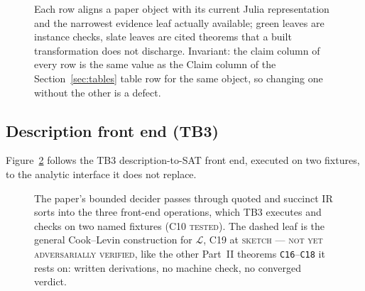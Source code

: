 \begin{figure}[H]
\centering

\caption{Each row aligns a paper object with its current Julia representation and the narrowest evidence leaf actually available; green leaves are instance checks, slate leaves are cited theorems that a built transformation does not discharge.  Invariant: the claim column of every row is the same value as the Claim column of the Section~\ref{sec:tables} table row for the same object, so changing one without the other is a defect.}
\label{fig:correspondence-map}
\end{figure}

\subsection{Description front end (TB3)}

Figure~\ref{fig:D-correspondence-description} follows the TB3
description-to-SAT front end, executed on two fixtures, to the analytic
interface it does not replace.
\begin{figure}[H]
\centering

\caption{The paper's bounded decider passes through quoted and succinct IR sorts into the three front-end operations, which TB3 executes and checks on two named fixtures (C10 \textsc{tested}).  The dashed leaf is the general Cook--Levin construction for \(\mathcal L\), C19 at \textsc{sketch --- not yet adversarially verified}, like the other Part~II theorems \texttt{C16}--\texttt{C18} it rests on: written derivations, no machine check, no converged verdict.}
\label{fig:D-correspondence-description}
\end{figure}


